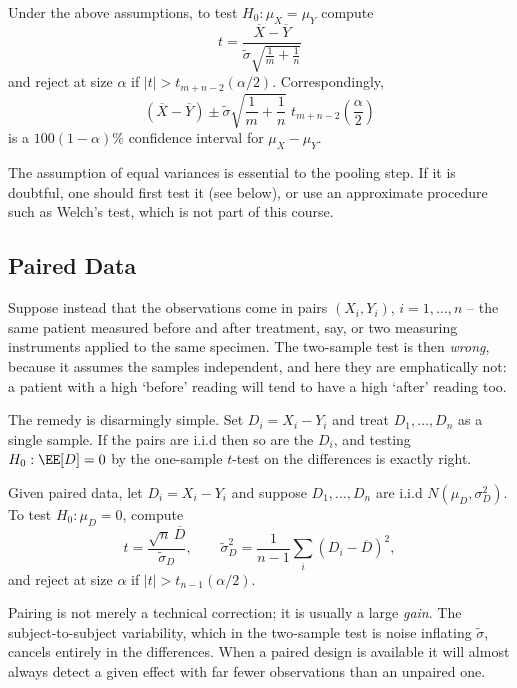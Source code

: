 \begin{definition}
  Under the above assumptions, to test $H_0 : \mu_X = \mu_Y$ compute
  $$
  t = \frac{\overline{X}-\overline{Y}}{\tilde\sigma\sqrt{\frac 1m+\frac 1n}}
  $$
  and reject at size $\alpha$ if $|t| > t_{m+n-2}(\alpha/2)$. Correspondingly,
  $$
  \left(\overline{X}-\overline{Y}\right) \pm \tilde\sigma\sqrt{\frac 1m + \frac 1n}\;t_{m+n-2}\!\left(\frac{\alpha}{2}\right)
  $$
  is a $100(1-\alpha)\%$ confidence interval for $\mu_X-\mu_Y$.
\end{definition}

The assumption of equal variances is essential to the pooling step. If it is doubtful, one should first test it (see below), or use an approximate procedure such as Welch's test, which is not part of this course.

\subsection{Paired Data}

Suppose instead that the observations come in pairs $(X_i, Y_i)$, $i = 1,\dots,n$ -- the same patient measured before and after treatment, say, or two measuring instruments applied to the same specimen. The two-sample test is then \emph{wrong}, because it assumes the samples independent, and here they are emphatically not: a patient with a high `before' reading will tend to have a high `after' reading too.

The remedy is disarmingly simple. Set $D_i = X_i - Y_i$ and treat $D_1,\dots,D_n$ as a single sample. If the pairs are i.i.d then so are the $D_i$, and testing $H_0 : \EE[D] = 0$ by the one-sample $t$-test on the differences is exactly right.

\begin{definition}
  Given paired data, let $D_i = X_i - Y_i$ and suppose $D_1,\dots,D_n$ are i.i.d $N(\mu_D,\sigma_D^2)$. To test $H_0 : \mu_D = 0$, compute
  $$
  t = \frac{\sqrt n\,\overline{D}}{\tilde\sigma_D}, \qquad \tilde\sigma_D^2 = \frac{1}{n-1}\sum_i\left(D_i - \overline{D}\right)^2,
  $$
  and reject at size $\alpha$ if $|t| > t_{n-1}(\alpha/2)$.
\end{definition}

Pairing is not merely a technical correction; it is usually a large \emph{gain}. The subject-to-subject variability, which in the two-sample test is noise inflating $\tilde\sigma$, cancels entirely in the differences. When a paired design is available it will almost always detect a given effect with far fewer observations than an unpaired one.

